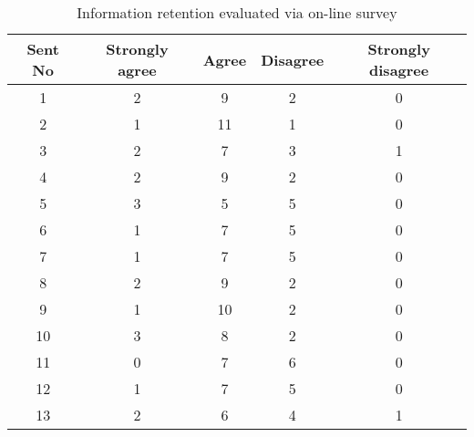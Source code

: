 \begin{table}[h]
\label{ch5:Survey}
\caption{Information retention evaluated via on-line survey}
 \begin{tabular}{|c|c|c|c|c|}
 \hline
Sent No &  Strongly agree &  Agree &  Disagree &  Strongly disagree \\ \hline
1 &  2 &  9 &  2 &  0 \\ \hline
2 &  1 &  11 &  1 &  0 \\ \hline
3 &  2 &  7 &  3 &  1 \\ \hline
4 &  2 &  9 &  2 &  0 \\ \hline
5 &  3 &  5 &  5 &  0 \\ \hline
6 &  1 &  7 &  5 &  0 \\ \hline
7 &  1 &  7 &  5 &  0 \\ \hline
8 &  2 &  9 &  2 &  0 \\ \hline
9 &  1 &  10 &  2 &  0 \\ \hline
10 &  3 &  8 &  2 &  0 \\ \hline
11 &  0 &  7 &  6 &  0 \\ \hline
12 &  1 &  7 &  5 &  0 \\ \hline
13 &  2 &  6 &  4 &  1 \\ \hline
\end{tabular}
\end{table}


